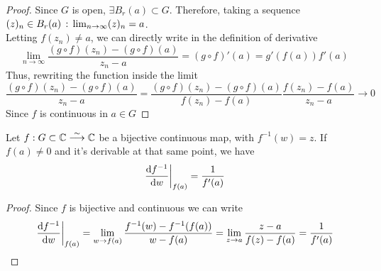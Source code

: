 \documentclass[../complete.tex]{subfiles}
\begin{document}
\begin{proof}
	Since $G$ is open, $\exists B_r(a)\subset G$. Therefore, taking a sequence $(z)_n\in B_r(a)\st\lim_{n\to\infty}(z)_n=a$.\\
	Letting $f(z_n)\ne a$, we can directly write in the definition of derivative
	\begin{equation*}
		\lim_{n\to\infty}\frac{(g\circ f)(z_n)-(g\circ f)(a)}{z_n-a}=(g\circ f)'(a)=g'(f(a))f'(a)
	\end{equation*}
	Thus, rewriting the function inside the limit
	\begin{equation*}
		\frac{(g\circ f)(z_n)-(g\circ f)(a)}{z_n-a}=\frac{(g\circ f)(z_n)-(g\circ f)(a)}{f(z_n)-f(a)}\frac{f(z_n)-f(a)}{z_n-a}\to0
	\end{equation*}
	Since $f$ is continuous in $a\in G$
\end{proof}
\begin{thm}
	Let $f:G\subset\Cf\fto[\sim]\Cf$ be a bijective continuous map, with $f^{-1}(w)=z$. If $f(a)\ne0$ and it's derivable at that same point, we have
	\begin{equation}
		\derin[f(a)]{\derivative{f^{-1}}{w}}=\frac{1}{f'(a)}
		\label{eq:inversedercf}
	\end{equation}
\end{thm}
\begin{proof}
	Since $f$ is bijective and continuous we can write
	\begin{equation*}
		\derin[f(a)]{\derivative{f^{-1}}{w}}=\lim_{w\to f(a)}\frac{f^{-1}(w)-f^{-1}(f(a))}{w-f(a)}=\lim_{z\to a}\frac{z-a}{f(z)-f(a)}=\frac{1}{f'(a)}
	\end{equation*}
\end{proof}
\end{document}
